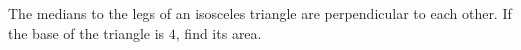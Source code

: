The medians to the legs of an isosceles triangle are perpendicular to each other. If the base of the triangle is $4$, find its area.
